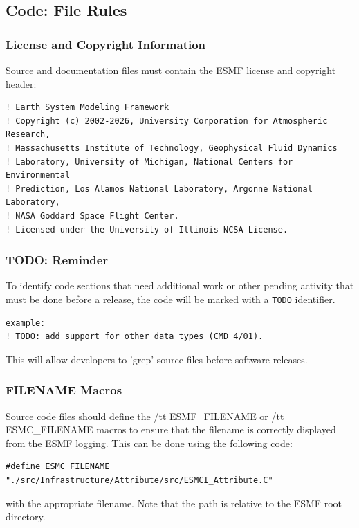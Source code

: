 \subsection{Code: File Rules} 

\subsubsection{License and Copyright Information}

Source and documentation files must contain the ESMF license and 
copyright header:

\begin{verbatim}
! Earth System Modeling Framework
! Copyright (c) 2002-2026, University Corporation for Atmospheric Research,
! Massachusetts Institute of Technology, Geophysical Fluid Dynamics
! Laboratory, University of Michigan, National Centers for Environmental
! Prediction, Los Alamos National Laboratory, Argonne National Laboratory,
! NASA Goddard Space Flight Center.
! Licensed under the University of Illinois-NCSA License.
\end{verbatim}

\subsubsection{TODO: Reminder} 
To identify code sections that need
additional work or other pending activity that must be done before a release,
the code will be marked with a {\tt TODO} identifier. 
\begin{verbatim}
example:
! TODO: add support for other data types (CMD 4/01).
\end{verbatim}
This will allow developers to 'grep' source files before software releases. 

\subsubsection{FILENAME Macros}
Source code files should define the {/tt ESMF\_FILENAME} or {/tt ESMC\_FILENAME}
macros to ensure that the filename is correctly displayed from the ESMF logging.
This can be done using the following code:

\begin{verbatim}
#define ESMC_FILENAME "./src/Infrastructure/Attribute/src/ESMCI_Attribute.C"
\end{verbatim}

with the appropriate filename.  Note that the path is relative to the ESMF
root directory.

